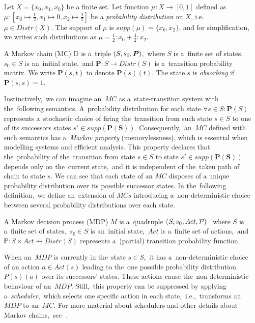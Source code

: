\begin{example}
    Let $X = \{x_0, x_1, x_0\}$ be a finite set.
    Let function $\mu: X \rightarrow [0,1]$ defined as $\mu: [x_0 \mapsto \frac{1}{2}, x_1 \mapsto 0, x_2 \mapsto \frac{1}{2}]$ be a \textit{probability distribution} on $X$, i.e. $\mu \in Distr(X)$.
    The support of $\mu$ is $supp(\mu) = \{x_0, x_2 \}$, and for simplification, we writes such distributions as $\mu = \frac{1}{2} : x_0 + \frac{1}{2} : x_2$.
\end{example}


\begin{definition}[MC]
\cite{tacas21}
    A Markov chain (MC) D is a~triple $(S,s_{0},\boldsymbol{P})$,~where $S$ is a~finite set of states,~$s_0 \in S$ is an~initial state,~and $\mathbf{P}: S \rightarrow Distr(S)$ is a~transition probability matrix.
    We write $\mathbf{P}(s, t)$ to denote $\mathbf{P}(s)(t)$.
    The state $s$ is \textit{absorbing} if $\mathbf{P}(s, s) = 1$.
\end{definition}

Instinctively,~we can imagine an~$MC$ as a~state-transition system with the~following semantics.
A~probability distribution for each state $\forall s \in S: \mathbf{P}(S)$ represents a~stochastic choice of firing the~transition from such state $s \in S$ to one of its successors states $s' \in supp(\mathbf{P(S)})$.
Consequently,~an~$MC$ defined with such semantics has a~\textit{Markov property} (memorylessness), which is essential when modelling systems and efficient analysis.
This property declares that the~probability of the~transition from state $s \in S$ to state $s' \in supp(\mathbf{P(S)})$ depends only on the~current state,~and it is independent of the~taken path of chain to state $s$.
We can see that each state of an $MC$ disposes of a unique probability distribution over its possible successor states.
In the~following definition,~we define an~extension of $MCs$ introducing a~non-deterministic choice between several probability distributions over each state.

\begin{definition}[MDP]
\cite{roman-DP}
    A Markov decision process (MDP) $M$ is a~quadruple $(S,s_{0},Act,\mathcal{P})$ ~where $S$ is a~finite set of states,~$s_0 \in S$ is an~initial state,~$Act$ is a~finite set of actions,~and $\mathbb{P}: S \times Act  \nrightarrow Distr(S)$ represents a~(partial) transition probability function. 
\end{definition}

When an~$MDP$ is currently in the~state $s \in S$,~it has a~non-deterministic choice of an action $a \in Act(s)$ leading to the~one possible probability distribution $P(s)(a)$ over its successors' states.
These actions cause the~non-deterministic behaviour of an~$MDP$.
Still,~this property can be suppressed by applying a~\textit{scheduler},~which selects one specific action in each state,~i.e.,~transforms an~$MDP$ to an~$MC$.
For more material about schedulers and other details about Markov chains,~see~\cite{roman-DP}.

